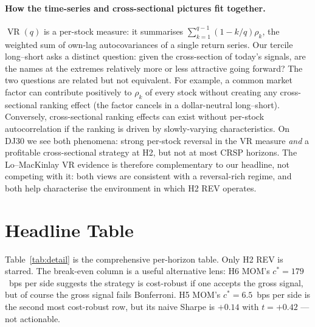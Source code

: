 \documentclass[10pt,conference,compsoc]{IEEEtran}
\newcommand{\VR}{\operatorname{VR}}   \newcommand{\sign}{\operatorname{sign}}
\begin{document}
\paragraph{How the time-series and cross-sectional pictures fit
together.} $\VR(q)$ is a per-stock measure: it summarises
$\sum_{k=1}^{q-1}(1-k/q)\rho_k$, the weighted sum of own-lag
autocovariances of a single return series. Our tercile
long--short asks a distinct question: given the cross-section of
today's signals, are the names at the extremes relatively more
or less attractive going forward? The two questions are related
but not equivalent. For example, a common market factor can
contribute positively to $\rho_k$ of every stock without creating
any cross-sectional ranking effect (the factor cancels in a
dollar-neutral long--short). Conversely, cross-sectional ranking
effects can exist without per-stock autocorrelation if the
ranking is driven by slowly-varying characteristics. On DJ30 we
see both phenomena: strong per-stock reversal in the VR measure
\emph{and} a profitable cross-sectional strategy at H2, but not at
most CRSP horizons. The Lo--MacKinlay VR evidence is therefore
complementary to our headline, not competing with it: both views
are consistent with a reversal-rich regime, and both help
characterise the environment in which H2 REV operates.

\section{Headline Table}
\label{sec:table}

\begin{table}[t]
\centering
\caption{Per-horizon detailed results. $c$ is the assumed per-side
cost; turn.\ is the average turnover per rebalance; $c^{*}$ is the
break-even per-side cost (gross mean divided by average turnover).
${}^{*}$ indicates rows where $t$ clears the Bonferroni threshold
$t^{*}\approx 2.87$ on the correct (positive) side.}
\label{tab:detail}
\small

\end{table}

Table~\ref{tab:detail} is the comprehensive per-horizon table.
Only H2 REV is starred. The break-even column is a useful
alternative lens: H6 MOM's $c^{*} = 179$~bps per side suggests
the strategy is cost-robust if one accepts the gross signal, but
of course the gross signal fails Bonferroni. H5 MOM's $c^{*} =
6.5$~bps per side is the second most cost-robust row, but its
naive Sharpe is $+0.14$ with $t = +0.42$ --- not actionable.
\end{document}
